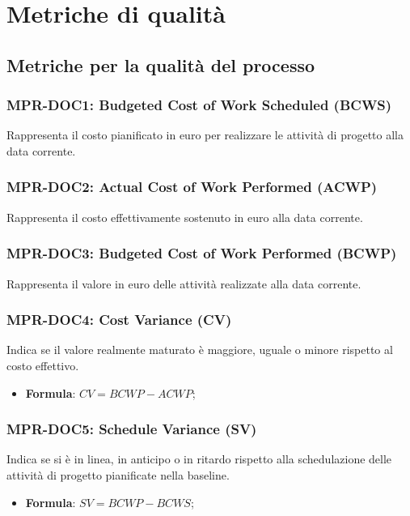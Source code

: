 \appendix
\section{Metriche di qualità}

\subsection{Metriche per la qualità del processo} \label{_metricheprocesso}

\subsubsection{MPR-DOC1: Budgeted Cost of Work Scheduled (BCWS)} \label{_MPR-DOC1}
Rappresenta il costo pianificato in euro per realizzare le attività di progetto alla data corrente.

\subsubsection{MPR-DOC2: Actual Cost of Work Performed (ACWP)} \label{_MPR-DOC2}
Rappresenta il costo effettivamente sostenuto in euro alla data corrente.

\subsubsection{MPR-DOC3: Budgeted Cost of Work Performed (BCWP)} \label{_MPR-DOC3}
Rappresenta il valore in euro delle attività realizzate alla data corrente.

\subsubsection{MPR-DOC4: Cost Variance (CV)} \label{_MPR-DOC4}
Indica se il valore realmente maturato è maggiore, uguale o minore rispetto al costo effettivo.
\begin{itemize}
    \item \textbf{Formula}: $CV = BCWP - ACWP$;
\end{itemize}

\subsubsection{MPR-DOC5: Schedule Variance (SV)} \label{_MPR-DOC5}
Indica se si è in linea, in anticipo o in ritardo rispetto alla schedulazione delle attività di progetto pianificate nella baseline.
\begin{itemize}
    \item \textbf{Formula}: $SV = BCWP - BCWS$;
\end{itemize}



